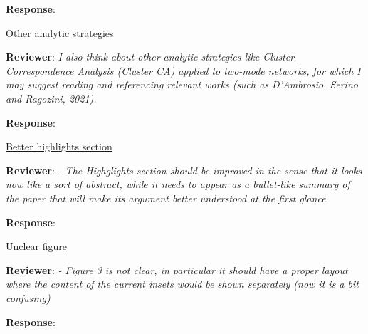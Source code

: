 \documentclass{article}
\begin{document}
\textbf{Response}:

\underline{Other analytic strategies}

\textbf{Reviewer}: \textit{I also think about other analytic strategies like Cluster Correspondence Analysis (Cluster CA) applied to two-mode networks, for which I may suggest reading and referencing relevant works (such as D'Ambrosio, Serino and Ragozini, 2021).}

\textbf{Response}:

\underline{Better highlights section}

\textbf{Reviewer}: \textit{- The Highglights section should be improved in the sense that it looks now like a sort of abstract, while it needs to appear as a bullet-like summary of the paper that will make its argument better understood at the first glance}

\textbf{Response}:

\underline{Unclear figure}

\textbf{Reviewer}: \textit{- Figure 3 is not clear, in particular it should have a proper layout where the content of the current insets would be shown separately (now it is a bit confusing)}

\textbf{Response}:
\end{document}
